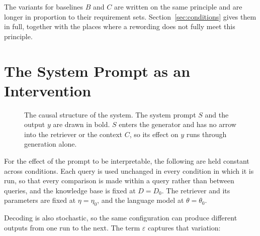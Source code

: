 \documentclass[12pt,a4paper,oneside]{scrreprt}
\begin{document}
The variants for baselines $B$ and $C$ are written on the same principle and are longer in proportion to their requirement sets. Section~\ref{sec:conditions} gives them in full, together with the places where a rewording does not fully meet this principle.

\section{The System Prompt as an Intervention}
\label{sec:intervention}

\begin{figure}[htbp]
\centering
{}
\caption{The causal structure of the system. The system prompt $S$ and the output $y$ are drawn in bold. $S$ enters the generator and has no arrow into the retriever or the context $C$, so its effect on $y$ runs through generation alone.}
\label{fig:causal}
\end{figure}

For the effect of the prompt to be interpretable, the following are held constant across conditions. Each query is used unchanged in every condition in which it is run, so that every comparison is made within a query rather than between queries, and the knowledge base is fixed at $D = D_0$. The retriever and its parameters are fixed at $\eta = \eta_0$, and the language model at $\theta = \theta_0$.

Decoding is also stochastic, so the same configuration can produce different outputs from one run to the next. The term $\varepsilon$ captures that variation:
\end{document}
